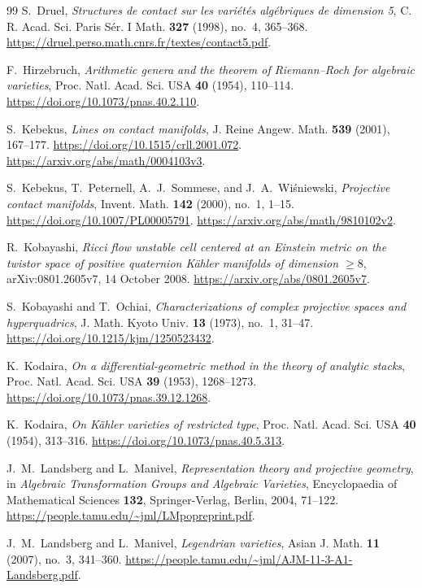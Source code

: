 \begin{thebibliography}{99}
S.~Druel,
\emph{Structures de contact sur les vari\'et\'es alg\'ebriques de dimension 5},
C. R. Acad. Sci. Paris S\'er. I Math. \textbf{327} (1998), no.~4, 365--368.
\url{https://druel.perso.math.cnrs.fr/textes/contact5.pdf}.

F.~Hirzebruch,
\emph{Arithmetic genera and the theorem of Riemann--Roch for algebraic varieties},
Proc. Natl. Acad. Sci. USA \textbf{40} (1954), 110--114.
\url{https://doi.org/10.1073/pnas.40.2.110}.

S.~Kebekus,
\emph{Lines on contact manifolds},
J. Reine Angew. Math. \textbf{539} (2001), 167--177.
\url{https://doi.org/10.1515/crll.2001.072}.
\url{https://arxiv.org/abs/math/0004103v3}.

S.~Kebekus, T.~Peternell, A.~J.~Sommese, and J.~A.~Wi\'sniewski,
\emph{Projective contact manifolds},
Invent. Math. \textbf{142} (2000), no.~1, 1--15.
\url{https://doi.org/10.1007/PL00005791}.
\url{https://arxiv.org/abs/math/9810102v2}.

R.~Kobayashi,
\emph{Ricci flow unstable cell centered at an Einstein metric on the
twistor space of positive quaternion K\"ahler manifolds of dimension $\geq8$},
arXiv:0801.2605v7, 14 October 2008.
\url{https://arxiv.org/abs/0801.2605v7}.

S.~Kobayashi and T.~Ochiai,
\emph{Characterizations of complex projective spaces and hyperquadrics},
J. Math. Kyoto Univ. \textbf{13} (1973), no.~1, 31--47.
\url{https://doi.org/10.1215/kjm/1250523432}.

K.~Kodaira,
\emph{On a differential-geometric method in the theory of analytic stacks},
Proc. Natl. Acad. Sci. USA \textbf{39} (1953), 1268--1273.
\url{https://doi.org/10.1073/pnas.39.12.1268}.

K.~Kodaira,
\emph{On K\"ahler varieties of restricted type},
Proc. Natl. Acad. Sci. USA \textbf{40} (1954), 313--316.
\url{https://doi.org/10.1073/pnas.40.5.313}.

J.~M.~Landsberg and L.~Manivel,
\emph{Representation theory and projective geometry},
in \emph{Algebraic Transformation Groups and Algebraic Varieties},
Encyclopaedia of Mathematical Sciences \textbf{132},
Springer-Verlag, Berlin, 2004, 71--122.
\url{https://people.tamu.edu/~jml/LMpopreprint.pdf}.

J.~M.~Landsberg and L.~Manivel,
\emph{Legendrian varieties},
Asian J. Math. \textbf{11} (2007), no.~3, 341--360.
\url{https://people.tamu.edu/~jml/AJM-11-3-A1-Landsberg.pdf}.


\end{thebibliography}
